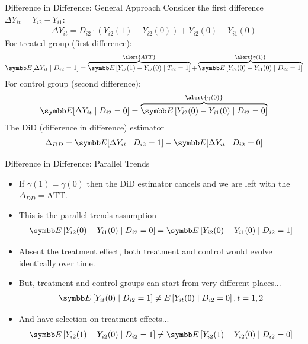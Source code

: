 \documentclass[aspectratio=169,11pt]{beamer}
\begin{document}
\begin{frame}{Difference in Difference: General Approach}
\small
Consider the first difference $\Delta Y_{it} = Y_{i2} - Y_{i1}$:
\begin{align*}
\Delta Y_{it}  = D_{i2} \cdot \left(Y_{i2}(1) - Y_{i2}(0) \right) +  Y_{i2}(0) - Y_{i1}(0)
\end{align*}
For treated group (first difference):
\begin{align*}
\E[\Delta Y_{it} \mid D_{i2}=1]  = \overbrace{\E\left[Y_{i2}(1) - Y_{i2}(0) \mid T_{i2}=1 \right]}^{\alert{ATT}} +  \overbrace{\E\left[Y_{i2}(0) - Y_{i1}(0) \mid D_{i2}=1 \right]}^{\alert{\gamma(1)}}
\end{align*}
For control group (second difference):
\begin{align*}
\E[\Delta Y_{it} \mid D_{i2}=0]  = \overbrace{\E\left[Y_{i2}(0) - Y_{i1}(0) \mid D_{i2}=0 \right]}^{\alert{\gamma(0)}}
\end{align*}
The DiD (difference in difference) estimator
\begin{align*}
\Delta_{DD} = \E[\Delta Y_{it} \mid D_{i2}=1]  - \E[\Delta Y_{it} \mid D_{i2}=0]  
\end{align*}
\end{frame}



\begin{frame}{Difference in Difference: Parallel Trends}
\small
\begin{itemize}
\item If $\gamma(1) = \gamma(0)$ then the DiD estimator cancels and we are left with the $\Delta_{DD} = \text{ATT}$.
\item This is the \alert{parallel trends assumption}
\begin{align*}
\E\left[Y_{i2}(0) - Y_{i1}(0) \mid D_{i2}=0 \right] = \E\left[Y_{i2}(0) - Y_{i1}(0) \mid D_{i2}=1 \right]
\end{align*}
\item Absent the treatment effect, both treatment and control would evolve identically over time.
\item But, treatment and control groups can start from very different places...
\begin{align*}
\E\left[Y_{i t}(0) \mid D_{i 2}=1\right] \neq E\left[Y_{i t}(0) \mid D_{i 2}=0\right], t=1,2
\end{align*}
\item And have selection on treatment effects...
\begin{align*}
\E\left[Y_{i 2}(1)-Y_{i 2}(0) \mid D_{i 2}=1\right] \neq \E\left[Y_{i 2}(1)-Y_{i 2}(0) \mid D_{i 2}=0\right]
\end{align*}
\end{itemize}
\end{frame}
\end{document}
